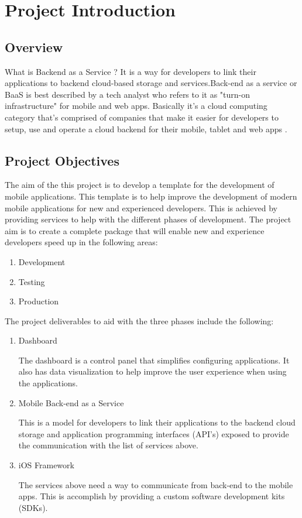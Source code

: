 \chapter{Project Introduction}

\section{Overview}

What is Backend as a Service ? It is a way for developers to link their applications to backend cloud-based storage and services.Back-end as a service or BaaS is best described by a tech analyst who refers to it as "turn-on infrastructure" for mobile and web apps. Basically it's a cloud computing category that's comprised of companies that make it easier for developers to setup, use and operate a cloud backend for their mobile, tablet and web apps \cite{kinveywebsite}.  

\section{Project Objectives}
The aim of the this project is to develop a template for the development of mobile applications. This template is to help improve the development of modern mobile applications for new and experienced developers. This is achieved by providing services to help with the different phases of development. The project aim is to create a complete package that will enable new and experience developers speed up in the following areas:

\begin{enumerate}
  \item Development
  \item Testing 
  \item Production
\end{enumerate}

The project deliverables to aid with the three phases include the following:

\begin{enumerate}
  \item Dashboard
  
    The dashboard is a control panel that simplifies configuring applications. It also has data visualization to help improve the user experience when using the applications.
  \item Mobile Back-end as a Service
  
    This is a model for developers to link their applications to the backend cloud storage and application programming interfaces (API's) exposed to provide the communication with the list of services above.
  \item iOS Framework
  
    The services above need a way to communicate from back-end to the mobile apps. This is accomplish by providing a custom software development kits (SDKs).
\end{enumerate}

